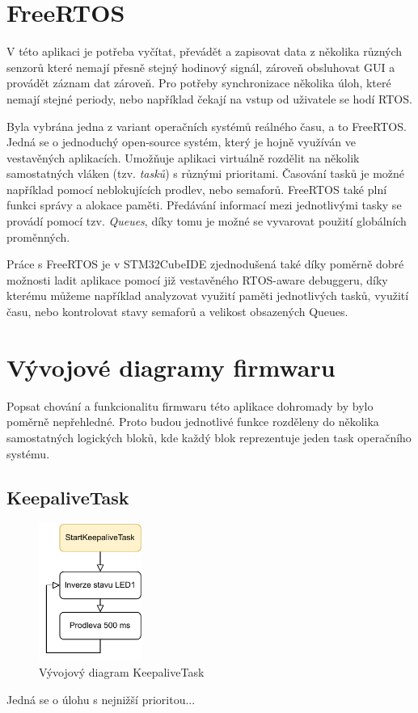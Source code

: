 \section{FreeRTOS}
V této aplikaci je potřeba vyčítat, převádět a zapisovat data z několika různých senzorů které nemají přesně stejný hodinový signál, zároveň obsluhovat \ac{GUI} a provádět záznam dat zároveň. Pro potřeby synchronizace několika úloh, které nemají stejné periody, nebo například čekají na vstup od uživatele se hodí \ac{RTOS}.

Byla vybrána jedna z variant operačních systémů reálného času, a to FreeRTOS. Jedná se o jednoduchý open-source systém, který je hojně využíván ve vestavěných aplikacích. Umožňuje aplikaci virtuálně rozdělit na několik samostatných vláken (tzv. \emph{tasků}) s různými prioritami. Časování tasků je možné například pomocí neblokujících prodlev, nebo semaforů. FreeRTOS také plní funkci správy a alokace paměti. Předávání informací mezi jednotlivými tasky se provádí pomocí tzv. \emph{Queues}, díky tomu je možné se vyvarovat použití globálních proměnných. \cite{Zhu2011}

Práce s FreeRTOS je v STM32CubeIDE zjednodušená také díky poměrně dobré možnosti ladit aplikace pomocí již vestavěného RTOS-aware debuggeru, díky kterému můžeme například analyzovat využití paměti jednotlivých tasků, využití času, nebo kontrolovat stavy semaforů a velikost obsazených Queues. 

\section{Vývojové diagramy firmwaru}
Popsat chování a funkcionalitu firmwaru této aplikace dohromady by bylo poměrně nepřehledné. Proto budou jednotlivé funkce rozděleny do několika samostatných logických bloků, kde každý blok reprezentuje jeden task operačního systému.

\subsection{KeepaliveTask}
\begin{figure}[h]
    \centering
    \includegraphics[width=0.3\textwidth]{obrazky/KeepaliveTask}
    \caption{Vývojový diagram KeepaliveTask}
\end{figure}
Jedná se o úlohu s nejnižší prioritou...

